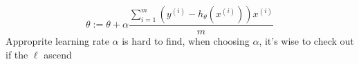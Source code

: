 \begin{answer}
    $$
    \theta:=\theta + \alpha\frac{\sum_{i=1}^m (y^{(i)} - h_\theta(x^{(i)}))x^{(i)}}{m}
    $$
    Approprite learning rate $\alpha$ is hard to find, when choosing $\alpha$, it's wise to check out if the $\ell$ ascend
\end{answer}
